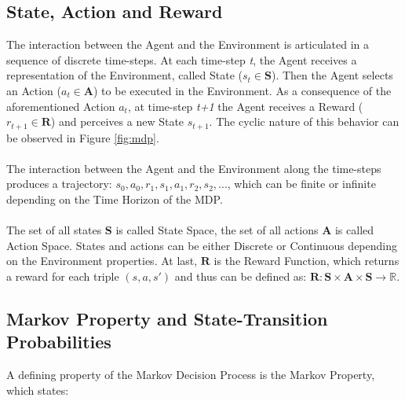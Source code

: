         \subsection{State, Action and Reward}
            \label{subs:sar}
            The interaction between the Agent and the Environment is articulated in a sequence of discrete time-steps. At each time-step \textit{t}, the Agent receives a representation of the Environment, called State ($s_t\in \mathbf{S}$). Then the Agent selects an Action ($a_t\in \mathbf{A}$)  to be executed in the Environment. As a consequence of the aforementioned Action $a_t$, at time-step \textit{t+1} the Agent receives a Reward ($r_{t+1}\in \mathbf{R}$) and perceives a new State $s_{t+1}$. The cyclic nature of this behavior can be observed in Figure \ref{fig:mdp}. 
            \\\\
            The interaction between the Agent and the Environment along the time-steps produces a trajectory: $s_0, a_0, r_1, s_1, a_1, r_2, s_2, ...$, which can be finite or infinite depending on the Time Horizon of the MDP.
            \\\\
            The set of all states $\mathbf{S}$ is called State Space, the set of all actions $\mathbf{A}$ is called Action Space. States and actions can be either Discrete or Continuous depending on the Environment properties. At last, $\mathbf{R}$ is the Reward Function, which returns a reward for each triple $(s, a, s')$ and thus can be defined as: $\mathbf{R}: \mathbf{S} \times \mathbf{A} \times \mathbf{S} \rightarrow \mathds{R}$.
            
        \subsection{Markov Property and State-Transition Probabilities}
            \label{subs:markov}
            A defining property of the Markov Decision Process is the Markov Property, which states: 
            
